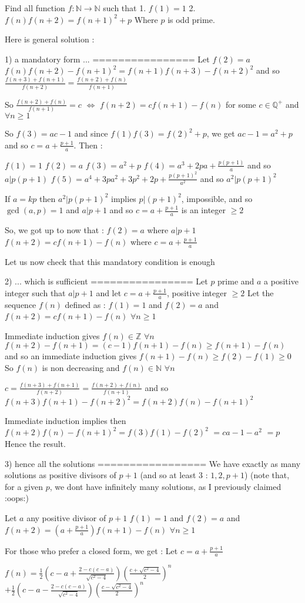 \begin{solution}
	\begin{tcolorbox}Find all function $f:\mathbb{N} \to \mathbb{N}$ such that 
1. $f(1)=1$
2. $f(n)f(n+2)=f(n+1)^2+p$
Where $p$ is odd prime.\end{tcolorbox}
Here is general solution :

1) a mandatory form ...
================
Let $f(2)=a$
$f(n)f(n+2)-f(n+1)^2=f(n+1)f(n+3)-f(n+2)^2$ and so $\frac{f(n+3)+f(n+1)}{f(n+2)}=\frac{f(n+2)+f(n)}{f(n+1)}$

So $\frac{f(n+2)+f(n)}{f(n+1)}=c$ $\iff$ $f(n+2)=cf(n+1)-f(n)$ for some $c\in\mathbb Q^+$ and $\forall n\ge 1$

So $f(3)=ac-1$ and since $f(1)f(3)=f(2)^2+p$, we get $ac-1=a^2+p$ and so $c=a+\frac{p+1}a$. Then :

$f(1)=1$
$f(2)=a$
$f(3)=a^2+p$
$f(4)=a^3+2pa+\frac{p(p+1)}a$ and so $a|p(p+1)$
$f(5)=a^4+3pa^2+3p^2+2p+\frac{p(p+1)^2}{a^2}$ and so $a^2|p(p+1)^2$

If $a=kp$ then $a^2|p(p+1)^2$ implies $p|(p+1)^2$, impossible, and so $\gcd(a,p)=1$ and $a|p+1$ and so $c=a+\frac{p+1}a$ is an integer $\ge 2$

So, we got up to now that :
$f(2)=a$ where $a|p+1$ 
$f(n+2)=cf(n+1)-f(n)$ where $c=a+\frac{p+1}a$

Let us now check that this mandatory condition is enough

2) ... which is sufficient
================
Let $p$ prime and $a$ a positive integer such that $a|p+1$ and let $c=a+\frac{p+1}a$, positive integer $\ge 2$
Let the sequence $f(n)$ defined as :
$f(1)=1$ and $f(2)=a$ and $f(n+2)=cf(n+1)-f(n)$ $\forall n\ge 1$

Immediate induction gives $f(n)\in\mathbb Z$ $\forall n$
$f(n+2)-f(n+1)=(c-1)f(n+1)-f(n)\ge f(n+1)-f(n)$ and so an immediate induction gives $f(n+1)-f(n)\ge f(2)-f(1)\ge 0$
So $f(n)$ is non decreasing and $f(n)\in\mathbb N$ $\forall n$

$c=\frac{f(n+3)+f(n+1)}{f(n+2)}=\frac{f(n+2)+f(n)}{f(n+1)}$ and so $f(n+3)f(n+1)-f(n+2)^2=f(n+2)f(n)-f(n+1)^2$

Immediate induction implies then $f(n+2)f(n)-f(n+1)^2=f(3)f(1)-f(2)^2$ $=ca-1-a^2$ $=p$
Hence the result.

3) hence all the solutions
=================
We have exactly as many solutions as positive divisors of $p+1$ (and so at least $3$ : $1,2,p+1$) (note that, for a given $p$, we dont have infinitely many solutions, as I previously claimed :oops:)

Let $a$ any positive divisor of $p+1$
$f(1)=1$ and $f(2)=a$ and $f(n+2)=(a+\frac{p+1}a)f(n+1)-f(n)$ $\forall n\ge 1$

For those who prefer a closed form, we get :
Let $c=a+\frac{p+1}a$

$f(n)=\frac 12\left(c-a+\frac{2-c(c-a)}{\sqrt{c^2-4}}\right)\left(\frac{c+\sqrt{c^2-4}}2\right)^n$ $+\frac 12\left(c-a-\frac{2-c(c-a)}{\sqrt{c^2-4}}\right)\left(\frac{c-\sqrt{c^2-4}}2\right)^n$
\end{solution}
